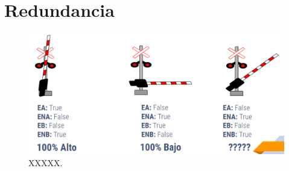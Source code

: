 \section{Redundancia}

\lipsum[1]

\begin{figure}[!h]
        \centering
        \includegraphics[width=1\textwidth]{Figuras/antagonica}
        \centering\caption{XXXXX.}
        \label{fig:redundancia_1}
    \end{figure}

\lipsum[1]
